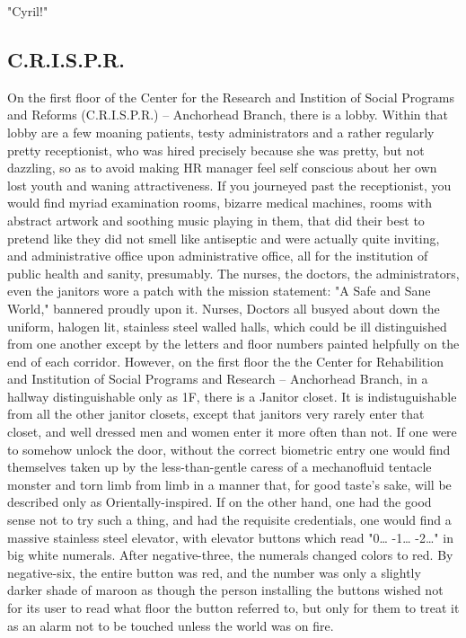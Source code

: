\documentclass[12pt]{article}
\begin{document}
"Cyril!"

\subsection*{C.R.I.S.P.R.}
\label{sec:org8b3c06f}

On the first floor of the Center for the Research and Instition of Social Programs and Reforms (C.R.I.S.P.R.) -- Anchorhead Branch, there is a lobby. Within that lobby are a few moaning patients, testy administrators and a rather regularly pretty receptionist, who was hired precisely because she was pretty, but not dazzling, so as to avoid making HR manager feel self conscious about her own lost youth and waning attractiveness. If you journeyed past the receptionist, you would find myriad examination rooms, bizarre medical machines, rooms with abstract artwork and soothing music playing in them, that did their best to pretend like they did not smell like antiseptic and were actually quite inviting, and administrative office upon administrative office, all for the institution of public health and sanity, presumably. The nurses, the doctors, the administrators, even the janitors wore a patch with the mission statement: "A Safe and Sane World," bannered proudly upon it. Nurses, Doctors all busyed about down the uniform, halogen lit, stainless steel walled halls, which could be ill distinguished from one another except by the letters and floor numbers painted helpfully on the end of each corridor. However, on the first floor the the Center for Rehabilition and Institution of Social Programs and Research -- Anchorhead Branch, in a hallway distinguishable only as 1F, there is a Janitor closet. It is indistuguishable from all the other janitor closets, except that janitors very rarely enter that closet, and well dressed men and women enter it more often than not. If one were to somehow unlock the door, without the correct biometric entry one would find themselves taken up by the less-than-gentle caress of a mechanofluid tentacle monster and torn limb from limb in a manner that, for good taste's sake, will be described only as Orientally-inspired. If on the other hand, one had the good sense not to try such a thing, and had the requisite credentials, one would find a massive stainless steel elevator, with elevator buttons which read "0\ldots{} -1\ldots{} -2\ldots{}" in big white numerals. After negative-three, the numerals changed colors to red. By negative-six, the entire button was red, and the number was only a slightly darker shade of maroon as though the person installing the buttons wished not for its user to read what floor the button referred to, but only for them to treat it as an alarm not to be touched unless the world was on fire.
\end{document}
